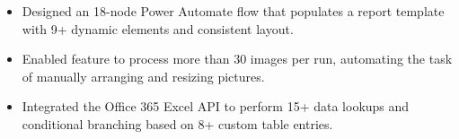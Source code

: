\projectItem[
        title={Technical Report Populator Using Power Automate},
        duration={June 2025 -- August 2025},
        keyHighlight={Personal Project},
        location={Remote}
    ]
    \begin{itemize}
        \vspace{-0.5em}
        \itemsep -6pt {}
        \item Designed an 18-node Power Automate flow that populates a report template with 9+ dynamic elements and consistent layout.
        \item Enabled feature to process more than 30 images per run, automating the task of manually arranging and resizing pictures. 
        \item Integrated the Office 365 Excel API to perform 15+ data lookups and conditional branching based on 8+ custom table entries.

    \end{itemize}
